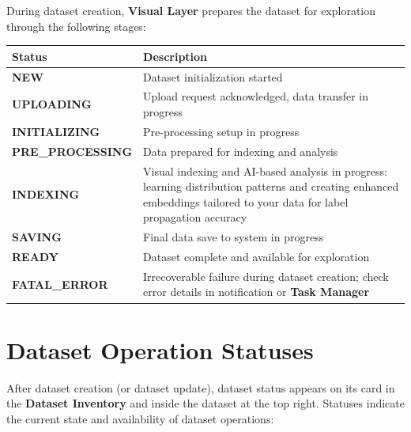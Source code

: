 \documentclass[
  11pt,
  a4paper,
  11pt,
  oneside]{report}
\renewcommand{\toprule}{\hline}
\renewcommand{\midrule}{\hline}
\renewcommand{\bottomrule}{\hline}
\begin{document}
\label{dataset-creation-stages}

During dataset creation, \textbf{Visual Layer} prepares the dataset for
exploration through the following stages:

\begin{longtable}[]{@{}
  >{\raggedright\arraybackslash}p{}
  >{\raggedright\arraybackslash}p{}@{}}
\toprule\noalign{}
\begin{minipage}[b]{\linewidth}\raggedright
\textbf{Status}
\end{minipage} & \begin{minipage}[b]{\linewidth}\raggedright
\textbf{Description}
\end{minipage} \\
\midrule\noalign{}
\endhead
\bottomrule\noalign{}
\endlastfoot
\textbf{NEW} & Dataset initialization started \\
\textbf{UPLOADING} & Upload request acknowledged, data transfer in
progress \\
\textbf{INITIALIZING} & Pre-processing setup in progress \\
\textbf{PRE\_PROCESSING} & Data prepared for indexing and analysis \\
\textbf{INDEXING} & Visual indexing and AI-based analysis in progress:
learning distribution patterns and creating enhanced embeddings tailored
to your data for label propagation accuracy \\
\textbf{SAVING} & Final data save to system in progress \\
\textbf{READY} & Dataset complete and available for exploration \\
\textbf{FATAL\_ERROR} & Irrecoverable failure during dataset creation;
check error details in notification or \textbf{Task Manager} \\
\end{longtable}

\chapter{Dataset Operation Statuses}\label{dataset-operation-statuses}

After dataset creation (or dataset update), dataset status appears on
its card in the \textbf{Dataset Inventory} and inside the dataset at the
top right. Statuses indicate the current state and availability of
dataset operations:
\end{document}

